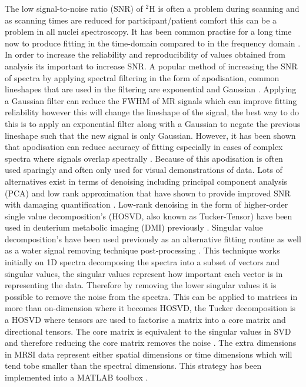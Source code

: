 \documentclass[class=article, crop=false]{standalone}
\begin{document}
The low signal-to-noise ratio (SNR) of $^2$H is often a problem during scanning and as scanning times are reduced for participant/patient comfort this can be a problem in all nuclei spectroscopy. It has been common practise for a long time now to produce fitting in the time-domain compared to in the frequency domain \cite{Joliot1991InMethods}. In order to increase the reliability and reproducibility of values obtained from analysis its important to increase SNR. A popular method of increasing the SNR of spectra by applying spectral filtering in the form of apodisation, common lineshapes that are used in the filtering are exponential and Gaussian \cite{Goryawala2020EffectsFitting}. Applying a Gaussian filter can reduce the FWHM of MR signals which can improve fitting reliability however this will change the lineshape of the signal, the best way to do this is to apply an exponential filter along with a Gaussian to negate the previous lineshape such that the new signal is only Gaussian. However, it has been shown that apodisation can reduce accuracy of fitting especially in cases of complex spectra where signals overlap spectrally \cite{Bartha1999FactorsFiltering}. Because of this apodisation is often used sparingly and often only used for visual demonstrations of data. Lots of alternatives exist in terms of denoising including principal component analysis (PCA) \cite{Abdoli2016DenoisingComponents} and low rank approximation \cite{Nguyen2013DenoisingApproximations} that have shown to provide improved SNR with damaging quantification \cite{Clarke2022UncertaintyMethods}. Low-rank denoising in the form of higher-order single value decomposition's (HOSVD, also known as Tucker-Tensor) have been used in deuterium metabolic imaging (DMI) previously \cite{Kreis2020MeasuringMRI,Assmann2020InCholesterol}. Singular value decomposition's have been used previously as an alternative fitting routine \cite{Pijnappel1992SVD-basedSignals} as well as a water signal removing technique post-processing \cite{Cabanes2001OptimizationBrain}. This technique works initially on 1D spectra decomposing the spectra into a subset of vectors and singular values, the singular values represent how important each vector is in representing the data. Therefore by removing the lower singular values it is possible to remove the noise from the spectra. This can be applied to matrices in more than on-dimension where it becomes HOSVD, the Tucker decomposition is a HOSVD where tensors are used to factorise a matrix into a core matrix and directional tensors. The core matrix is equivalent to the singular values in SVD and therefore reducing the core matrix removes the noise \cite{Tucker1966SomeAnalysis}. The extra dimensions in MRSI data represent either spatial dimensions or time dimensions which will tend tobe smaller than the spectral dimensions. This strategy has been implemented into a MATLAB toolbox \cite{Bader2007EfficientTensors}.
\end{document}
